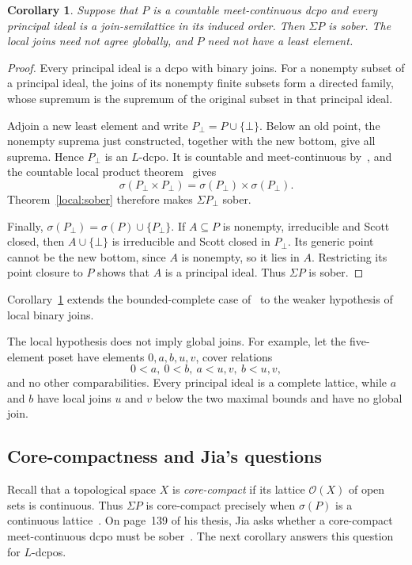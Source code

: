\documentclass[10pt,a4paper]{article}
\newtheorem{corollary}[theorem]{Corollary}
\theoremstyle{definition}
\begin{document}
\begin{corollary}\label{local:countable}
Suppose that $P$ is a countable meet-continuous dcpo and every principal ideal is a join-semilattice in its induced order. Then $\Sigma P$ is sober. The local joins need not agree globally, and $P$ need not have a least element.
\end{corollary}
\begin{proof}
Every principal ideal is a dcpo with binary joins. For a nonempty subset of a principal ideal, the joins of its nonempty finite subsets form a directed family, whose supremum is the supremum of the original subset in that principal ideal.

Adjoin a new least element and write $P_\bot=P\cup\{\bot\}$. Below an old point, the nonempty suprema just constructed, together with the new bottom, give all suprema. Hence $P_\bot$ is an $L$-dcpo. It is countable and meet-continuous by~\cite[Lemma~4.1]{Xu}, and the countable local product theorem~\cite[Theorem~3.4]{Xu} gives
\[
 \sigma(P_\bot\times P_\bot)=\sigma(P_\bot)\times\sigma(P_\bot).
\]
Theorem~\ref{local:sober} therefore makes $\Sigma P_\bot$ sober.

Finally, $\sigma(P_\bot)=\sigma(P)\cup\{P_\bot\}$. If $A\subseteq P$ is nonempty, irreducible and Scott closed, then $A\cup\{\bot\}$ is irreducible and Scott closed in $P_\bot$. Its generic point cannot be the new bottom, since $A$ is nonempty, so it lies in $A$. Restricting its point closure to $P$ shows that $A$ is a principal ideal. Thus $\Sigma P$ is sober.
\end{proof}

Corollary~\ref{local:countable} extends the bounded-complete case of~\cite[Proposition~4.3]{Xu} to the weaker hypothesis of local binary joins.

The local hypothesis does not imply global joins. For example, let the five-element poset have elements $0,a,b,u,v$, cover relations
\[
 0<a,~ 0<b,~ a<u,v,~ b<u,v,
\]
and no other comparabilities. Every principal ideal is a complete lattice, while $a$ and $b$ have local joins $u$ and $v$ below the two maximal bounds and have no global join.

\subsection{Core-compactness and Jia's questions}\label{local:subsec:jia}
Recall that a topological space $X$ is \emph{core-compact} if its lattice $\mathcal O(X)$ of open sets is continuous. Thus $\Sigma P$ is core-compact precisely when $\sigma(P)$ is a continuous lattice~\cite[Definition~2.5.1]{Jia}. On page~139 of his thesis, Jia asks whether a core-compact meet-continuous dcpo must be sober~\cite[Question~4.5.8]{Jia}. The next corollary answers this question for $L$-dcpos.
\end{document}
